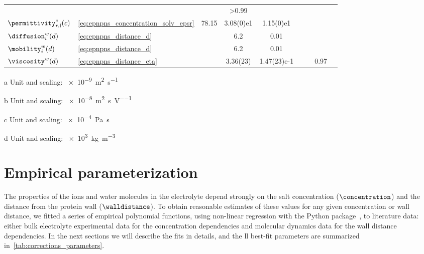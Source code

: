 \begin{landscape}
\begin{threeparttable}[p]
\begin{tabularx}{18cm}{@{}
            l l S[table-format=1.3] S[table-format=-1.2(2)e-1] S[table-format=-1.2(2)e-1]
            S[table-format=-1.2(2)e-1] S[table-format=-1.2(2)e-1] S[table-format=>1.2] l @{}}
      & & & >0.99 & \cite{Hai-Lang-1996} \\
      $\permittivity_{r,\text{f}}^c(c)$ & \cref{eq:epnpns_concentration_solv_epsr} & 78.15 & 3.08(0)e1 &
      1.15(0)e1 & & & & \cite{Buchner-1999,Gavish-2016} \\
      $\diffusion_{i}^w(d)$ & \cref{eq:epnpns_distance_d} & & 6.2 & 0.01 & & & &
      \cite{Makarov-1998,Simakov-2010,Pederson-2015} \\
      $\mobility_{i}^w(d)$ & \cref{eq:epnpns_distance_d} & & 6.2 & 0.01 & & & &
      \cite{Makarov-1998,Simakov-2010,Pederson-2015} \\
      $\viscosity^w(d)$ & \cref{eq:epnpns_distance_eta} & & 3.36(23) & 1.47(23)e-1 & & & 0.97 &
      \cite{Pronk-2014} \\
      \bottomrule
    \end{tabularx}
    \begin{tablenotes}
      \item[a] Unit and scaling: \SI{e-9}{\square\meter\per\second}
      \item[b] Unit and scaling: \SI{e-8}{\square\meter\per\second\per\volt}
      \item[c] Unit and scaling: \SI{e-4}{\pascal\second}
      \item[d] Unit and scaling: \SI{e3}{\kilo\gram\per\cubic\meter}
    \end{tablenotes}
  \end{threeparttable}
\end{landscape}
%


\section{Empirical parameterization}
%
\label{sec:epnp-ns:parameterization}
%

The properties of the ions and water molecules in the electrolyte depend strongly on the salt concentration
($\concentration$) and the distance from the protein wall ($\walldistance$). To obtain reasonable estimates of
these values for any given  concentration or wall distance, we fitted a series of empirical
polynomial functions, using non-linear regression with the  Python package~\cite{Newville-2014},
to literature data: either bulk electrolyte experimental data for the concentration dependencies and molecular
dynamics data for the wall distance dependencies. In the next sections we will describe the fits in details,
and the ll best-fit parameters are summarized in~\cref{tab:corrections_parameters}.

